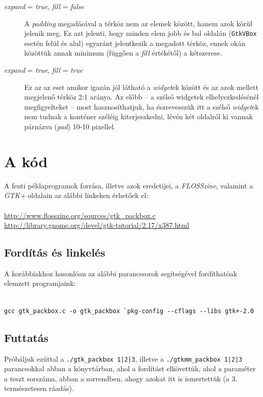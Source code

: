 \begin{description}
 \item[\textit{expand} = \textit{true}, \textit{fill} = \textit{false}] A \textit{padding} megadásával a térköz nem az elemek között, hanem azok körül jelenik meg. Ez azt jelenti, hogy minden elem jobb és bal oldalán (\texttt{GtkVBox} esetén felül és alul) egyaránt jelentkezik a megadott térköz, ennek okán közöttük annak minimum (függően a \textit{fill} értékétől) a kétszerese.

 \item[\textit{expand} = \textit{true}, \textit{fill} = \textit{true}] Ez az az eset amikor igazán jól látható a \textit{widget}ek között és az azok mellett megjelenő térköz 2:1 aránya. Az előbb -- a szélső widgetek elhelyezkedésénél megfigyelteket -- most hasznosíthatjuk, ha észrevesszük itt a szélső \textit{widget}ek nem tudnak a konténer széléig kiterjeszkedni, lévén két oldalról ki vannak párnázva (\textit{pad}) 10-10 pixellel.
\end{description}

\section{A kód}

A fenti példaprogramok forrása, illetve azok eredetijei, a \textit{FLOSSzine}, valamint a \textit{GTK+} oldalain az alábbi linkeken érhetőek el:
\ \\\\
\url{http://www.flosszine.org/sources/gtk_packbox.c}\\
\url{http://library.gnome.org/devel/gtk-tutorial/2.17/x387.html}

\subsection{Fordítás és linkelés}

A korábbiakhoz hasonlóan az alábbi parancssorok segítségével fordíthatóak elemzett programjaink:

\small
\ \\
\texttt{gcc gtk\_packbox.c -o gtk\_packbox \`{}pkg-config {-}-cflags {-}-libs gtk+-2.0}
\normalsize

\subsection{Futtatás}

Próbáljuk ezúttal a \texttt{./gtk\_packbox 1|2|3}, illetve a \texttt{./gtkmm\_packbox 1|2|3} parancsokkal abban a könyvtárban, ahol a fordítást elkövettük, ahol a paraméter a teszt sorszáma, abban a sorrendben, ahogy azokat itt is ismertettük (a 3. természetesen ráadás).

